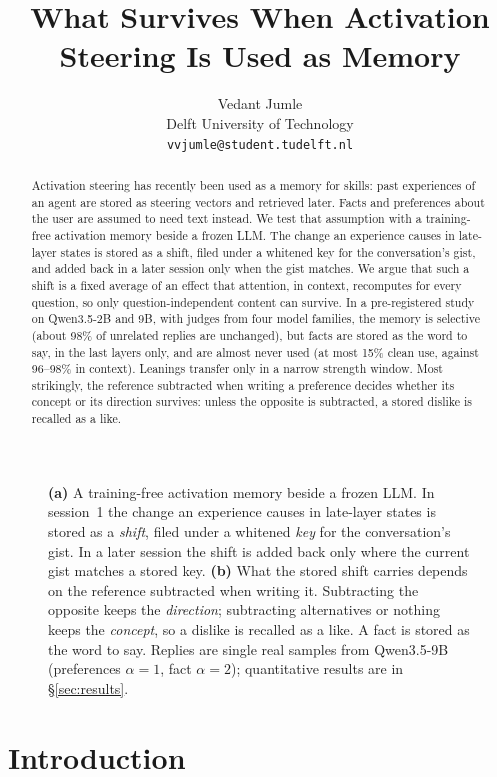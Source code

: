 \documentclass[11pt]{article}
\title{What Survives When Activation Steering Is Used as Memory}
\author{Vedant Jumle \\
  Delft University of Technology \\
  \texttt{vvjumle@student.tudelft.nl}}
\begin{document}
\maketitle

\begin{abstract}
Activation steering has recently been used as a memory for skills: past experiences of an agent are stored as steering vectors and retrieved later. Facts and preferences about the user are assumed to need text instead. We test that assumption with a training-free activation memory beside a frozen LLM. The change an experience causes in late-layer states is stored as a shift, filed under a whitened key for the conversation's gist, and added back in a later session only when the gist matches. We argue that such a shift is a fixed average of an effect that attention, in context, recomputes for every question, so only question-independent content can survive. In a pre-registered study on Qwen3.5-2B and 9B, with judges from four model families, the memory is selective (about 98\% of unrelated replies are unchanged), but facts are stored as the word to say, in the last layers only, and are almost never used (at most 15\% clean use, against 96--98\% in context). Leanings transfer only in a narrow strength window. Most strikingly, the reference subtracted when writing a preference decides whether its concept or its direction survives: unless the opposite is subtracted, a stored dislike is recalled as a like.
\end{abstract}

\begin{figure}[t]
  \centering
  \resizebox{\textwidth}{!}{}
  \caption{\textbf{(a)} A training-free activation memory beside a frozen LLM. In session~1 the change an experience
  causes in late-layer states is stored as a \emph{shift}, filed under a whitened \emph{key} for the conversation's gist.
  In a later session the shift is added back only where the current gist matches a stored key.
  \textbf{(b)} What the stored shift carries depends on the reference subtracted when writing it. Subtracting the
  opposite keeps the \emph{direction}; subtracting alternatives or nothing keeps the \emph{concept}, so a dislike is
  recalled as a like. A fact is stored as the word to say. Replies are single real samples from Qwen3.5-9B (preferences
  $\alpha{=}1$, fact $\alpha{=}2$); quantitative results are in \S\ref{sec:results}.}
  \label{fig:main}
\end{figure}

\section{Introduction}
\label{sec:intro}
\end{document}
